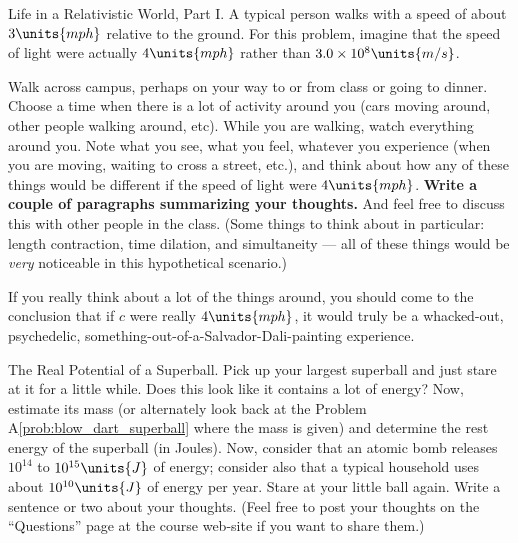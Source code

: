 \begin{aproblem}{Life in a Relativistic World, Part I.}
  A typical person walks with a speed of about $3\units{mph}$
  relative to the ground.  For this problem, imagine that the speed of
  light were actually $4\units{mph}$ rather than $3.0\times 10^8\units{m/s}$.

  Walk across campus, perhaps on your way to or from class or going to
  dinner.  Choose a time when there is a lot of activity around you
  (cars moving around, other people walking around, etc).  While you
  are walking, watch everything around you.  Note what you see, what
  you feel, whatever you experience (when you are moving, waiting to
  cross a street, etc.), and think about how any of these things would
  be different if the speed of light were $4\units{mph}$.  {\bf
    Write a couple of paragraphs summarizing your thoughts.}  And feel
  free to discuss this with other people in the class.  (Some things
  to think about in particular: length contraction, time dilation, and
  simultaneity --- all of these things would be {\em very} noticeable
  in this hypothetical scenario.)

  If you really think about a lot of the things around, you should
  come to the conclusion that if $c$ were really $4\units{mph}$, it
  would truly be a whacked-out, psychedelic,
  something-out-of-a-Salvador-Dali-painting experience.
  \label{prob:rel_worldI}
\end{aproblem}


\begin{aproblem}{The Real Potential of a Superball.}  
  Pick up your largest superball and just stare at it for a little
  while.  Does this look like it contains a lot of energy?  Now,
  estimate its mass (or alternately look back at the Problem
  A\ref{prob:blow_dart_superball} where the mass is given) and
  determine the rest energy of the superball (in Joules).  Now,
  consider that an atomic bomb releases $10^{14}$ to
  $10^{15}\units{J}$ of energy; consider also that a typical household
  uses about $10^{10}\units{J}$ of energy per year.  Stare at your
  little ball again.  Write a sentence or two about your thoughts.
  (Feel free to post your thoughts on the ``Questions'' page at the
  course web-site if you want to share them.)
\end{aproblem}


